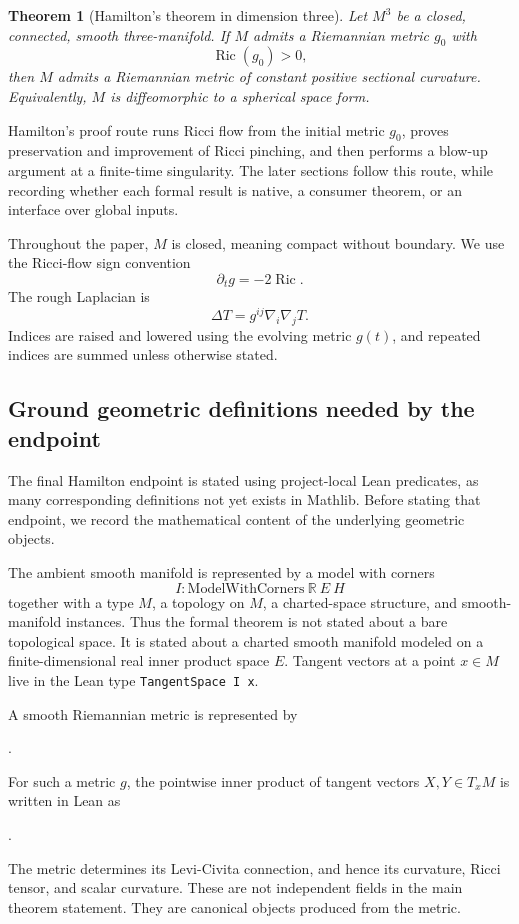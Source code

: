\documentclass[11pt]{article}
\theoremstyle{plain}
\newtheorem{theorem}{Theorem}[section]
\theoremstyle{definition}
\theoremstyle{remark}
\newcommand{\Ric}{\operatorname{Ric}}
\begin{document}
\begin{theorem}[Hamilton's theorem in dimension three]
\label{thm:main-hamilton-3d}
Let $M^3$ be a closed, connected, smooth three-manifold. If $M$ admits a
Riemannian metric $g_0$ with
\[
\Ric(g_0)>0,
\]
then $M$ admits a Riemannian metric of constant positive sectional curvature.
Equivalently, $M$ is diffeomorphic to a spherical space form.
\end{theorem}


Hamilton's proof route runs Ricci flow from the initial metric \(g_0\), proves
preservation and improvement of Ricci pinching, and then performs a blow-up
argument at a finite-time singularity.  The later sections follow this route,
while recording whether each formal result is native, a consumer theorem, or an
interface over global inputs.

Throughout the paper, $M$ is closed, meaning compact without boundary.  We use
the Ricci-flow sign convention
\[
  \partial_t g=-2\Ric.
\]
The rough Laplacian is
\[
  \Delta T=g^{ij}\nabla_i\nabla_jT.
\]
Indices are raised and lowered using the evolving metric $g(t)$, and repeated
indices are summed unless otherwise stated.

\subsection{Ground geometric definitions needed by the endpoint}
\label{subsec:ground-definitions-for-endpoint}

The final Hamilton endpoint is stated using project-local Lean predicates, as many corresponding definitions not yet exists in Mathlib.
Before stating that endpoint, we record the mathematical content of the
underlying geometric objects.

The ambient smooth manifold is represented by a model with corners
\[
  I : \mathrm{ModelWithCorners}\ \mathbb{R}\ E\ H
\]
together with a type \(M\), a topology on \(M\), a charted-space structure, and
smooth-manifold instances.  Thus the formal theorem is not stated about a bare
topological space.  It is stated about a charted smooth manifold modeled on a
finite-dimensional real inner product space \(E\).  Tangent vectors at a point
\(x\in M\) live in the Lean type \texttt{TangentSpace I x}.

A smooth Riemannian metric is represented by
\begin{center}
\texttt{}.
\end{center}
For such a metric \(g\), the pointwise inner product of tangent vectors
\(X,Y\in T_xM\) is written in Lean as
\begin{center}
\texttt{}.
\end{center}
The metric determines its Levi-Civita connection, and hence its curvature,
Ricci tensor, and scalar curvature.  These are not independent fields in the
main theorem statement.  They are canonical objects produced from the metric.
\end{document}
